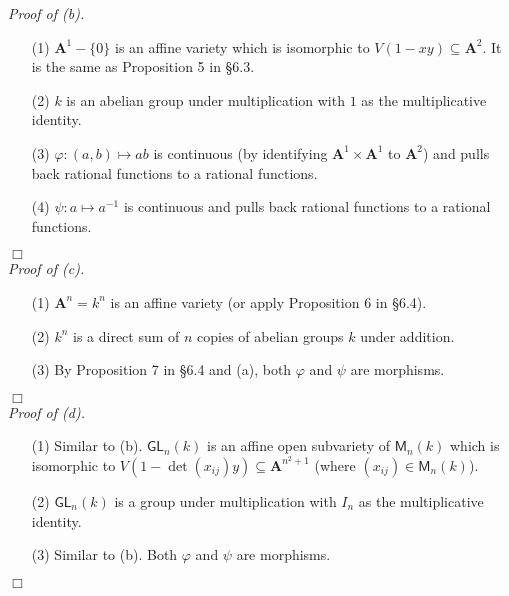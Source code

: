 \documentclass{article}
\begin{document}
\emph{Proof of (b).}
\begin{enumerate}
\item[(1)]
  $\mathbf{A}^{1} - \{0\}$ is an affine variety which is isomorphic to
  $V(1-xy) \subseteq \mathbf{A}^2$.
  It is the same as Proposition 5 in \S 6.3.

\item[(2)]
  $k$ is an abelian group under multiplication with $1$ as the multiplicative identity.

\item[(3)]
  $\varphi: (a,b) \mapsto ab$ is continuous
  (by identifying $\mathbf{A}^{1} \times \mathbf{A}^{1}$ to $\mathbf{A}^{2}$)
  and pulls back rational functions to a rational functions.

\item[(4)]
  $\psi: a \mapsto a^{-1}$ is continuous and pulls back rational functions to a rational functions.
\end{enumerate}
$\Box$ \\



\emph{Proof of (c).}
\begin{enumerate}
\item[(1)]
  $\mathbf{A}^{n} = k^n$ is an affine variety
  (or apply Proposition 6 in \S 6.4).

\item[(2)]
  $k^n$ is a direct sum of $n$ copies of abelian groups $k$ under addition.

\item[(3)]
  By Proposition 7 in \S 6.4 and (a),
  both $\varphi$ and $\psi$ are morphisms.
\end{enumerate}
$\Box$ \\



\emph{Proof of (d).}
\begin{enumerate}
\item[(1)]
  Similar to (b).
  $\mathsf{GL}_n(k)$ is an affine open subvariety of $\mathsf{M}_n(k)$ which is isomorphic to
  $V(1-\det(x_{ij})y) \subseteq \mathbf{A}^{n^2+1}$
  (where $(x_{ij}) \in \mathsf{M}_n(k)$).

\item[(2)]
  $\mathsf{GL}_n(k)$ is a group under multiplication with $I_n$ as the multiplicative identity.

\item[(3)]
  Similar to (b).
  Both $\varphi$ and $\psi$ are morphisms.
\end{enumerate}
$\Box$ \\
\end{document}
